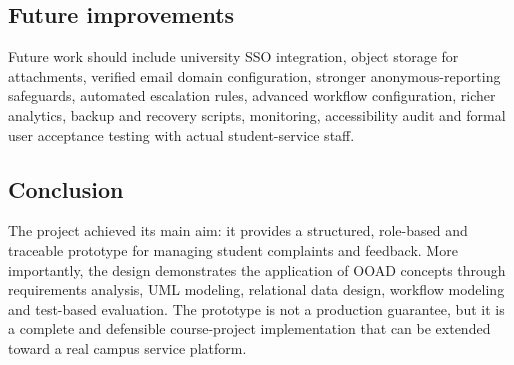 \documentclass[11pt,a4paper]{article}
\begin{document}
\subsection{Future improvements}
Future work should include university SSO integration, object storage for attachments, verified email domain configuration, stronger anonymous-reporting safeguards, automated escalation rules, advanced workflow configuration, richer analytics, backup and recovery scripts, monitoring, accessibility audit and formal user acceptance testing with actual student-service staff.

\subsection{Conclusion}
The project achieved its main aim: it provides a structured, role-based and traceable prototype for managing student complaints and feedback. More importantly, the design demonstrates the application of OOAD concepts through requirements analysis, UML modeling, relational data design, workflow modeling and test-based evaluation. The prototype is not a production guarantee, but it is a complete and defensible course-project implementation that can be extended toward a real campus service platform.
\end{document}
